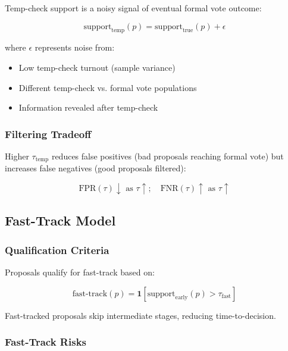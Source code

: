 Temp-check support is a noisy signal of eventual formal vote outcome:

\begin{equation}
\text{support}_{\text{temp}}(p) = \text{support}_{\text{true}}(p) + \epsilon
\end{equation}

where $\epsilon$ represents noise from:
\begin{itemize}
    \item Low temp-check turnout (sample variance)
    \item Different temp-check vs. formal vote populations
    \item Information revealed after temp-check
\end{itemize}

\subsubsection{Filtering Tradeoff}

Higher $\tau_{\text{temp}}$ reduces false positives (bad proposals reaching formal vote) but increases false negatives (good proposals filtered):

\begin{equation}
\text{FPR}(\tau) \downarrow \text{ as } \tau \uparrow; \quad \text{FNR}(\tau) \uparrow \text{ as } \tau \uparrow
\end{equation}

\subsection{Fast-Track Model}

\subsubsection{Qualification Criteria}

Proposals qualify for fast-track based on:

\begin{equation}
\text{fast-track}(p) = \mathbf{1}\left[\text{support}_{\text{early}}(p) > \tau_{\text{fast}}\right]
\end{equation}

Fast-tracked proposals skip intermediate stages, reducing time-to-decision.

\subsubsection{Fast-Track Risks}

